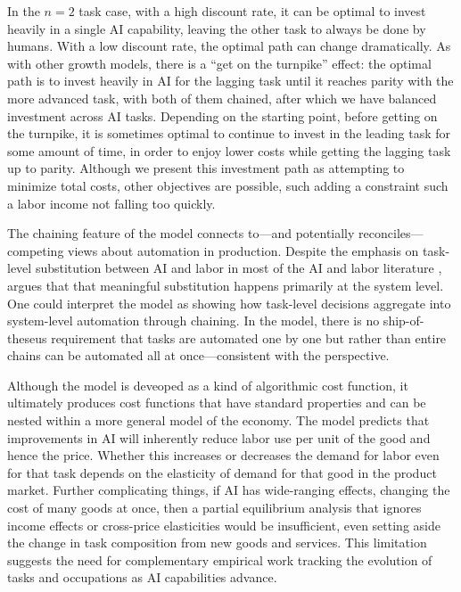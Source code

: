 \documentclass{article}
\begin{document}
In the $n = 2$ task case, with a high discount rate, it can be optimal to invest heavily in a single AI capability, leaving the other task to always be done by humans.
With a low discount rate, the optimal path can change dramatically. 
As with other growth models, there is a ``get on the turnpike'' effect: the optimal path is to invest heavily in AI for the lagging task until it reaches parity with the more advanced task, with both of them chained, after which we have balanced investment across AI tasks.
Depending on the starting point, before getting on the turnpike, it is sometimes optimal to continue to invest in the leading task for some amount of time, in order to enjoy lower costs while getting the lagging task up to parity.
Although we present this investment path as attempting to minimize total costs, other objectives are possible, such adding a constraint such a labor income not falling too quickly.

The chaining feature of the model connects to---and potentially reconciles---competing views about automation in production. 
Despite the emphasis on task-level substitution between AI and labor in most of the AI and labor literature \citep{autor2003skill, acemoglu2018automation}, \cite{bresnahan2002information} argues that that meaningful substitution happens primarily at the system level. 
One could interpret the model as showing how task-level decisions aggregate into system-level automation through chaining.
In the model, there is no ship-of-theseus requirement that tasks are automated one by one but rather than entire chains can be automated all at once---consistent with the \cite{bresnahan2002information} perspective.

Although the model is deveoped as a kind of algorithmic cost function, it ultimately produces cost functions that have standard properties and can be nested within a more general model of the economy. 
The model predicts that improvements in AI will inherently reduce labor use per unit of the good and hence the price.
Whether this increases or decreases the demand for labor even for that task depends on the elasticity of demand for that good in the product market.
Further complicating things, if AI has wide-ranging effects, changing the cost of many goods at once, then a partial equilibrium analysis that ignores income effects or cross-price elasticities would be insufficient, even setting aside the change in task composition from new goods and services.
This limitation suggests the need for complementary empirical work tracking the evolution of tasks and occupations as AI capabilities advance.
\end{document}
